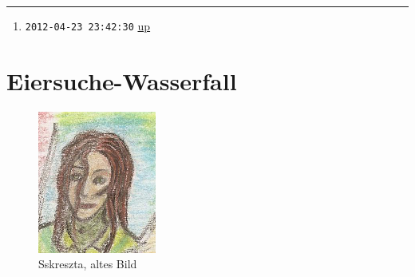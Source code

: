 \documentclass[11pt]{article}
\begin{document}
\begin{center}\rule{3in}{0.4pt}\end{center}

\begin{enumerate}
\item
  \texttt{2012-04-23 23:42:30}
  \href{http://1w6.org/print/book/export/html/59\#fnref:datum}{up}
\end{enumerate}
\section{Eiersuche-Wasserfall}

\begin{figure}[htbp]
\centering
\includegraphics{sskreszta-portrait-alt-klein.png}
\caption{Sskreszta, altes Bild}
\end{figure}
\end{document}
